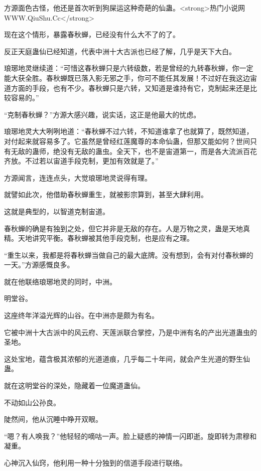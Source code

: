 
\begin{this_body}

方源面色古怪，他还是首次听到狗屎运这种奇葩的仙蛊。<strong>热门小说网WWW.QiuShu.Cc</strong>

现在这个情形，暴露春秋蝉，已经没有什么大不了的了。

反正天庭蛊仙已经知道，代表中洲十大古派也已经了解，几乎是天下大白。

琅琊地灵继续道：“可惜这春秋蝉只是六转级数，若是曾经的九转春秋蝉，你一定能大获全胜。春秋蝉既已落入影无邪之手，你可不能任其发展！不过好在我这边宙道方面的手段，也有不少。春秋蝉只是六转，又知道是谁持有它，克制起来还是比较容易的。”

“克制春秋蝉？”方源大感兴趣，说实话，这正是他最大的忧虑。

琅琊地灵大大咧咧地道：“春秋蝉不过六转，不知道谁拿了也就算了，既然知道，对付起来就容易多了。它虽然是曾经红莲魔尊的本命仙蛊，但那又能如何？世间只有无敌的蛊师，绝没有无敌的蛊虫。全天下，也不是宙道第一，而是各大流派百花齐放。不过若以宙道手段克制，更加有效就是了。”

方源闻言，连连点头，大觉琅琊地灵说得有理。

就譬如此次，他借助春秋蝉重生，就被影宗算到，甚至大肆利用。

这就是典型的，以智道克制宙道。

春秋蝉的确是有独到之处，但它并非是无敌的存在。人是万物之灵，蛊是天地真精。天地讲究平衡。春秋蝉被其他手段克制，也是应有之理。

“重生以来，我都是将春秋蝉当做自己的最大底牌。没有想到，会有对付春秋蝉的一天。”方源感慨良多。

就在他联络琅琊地灵的同时，中洲。

明堂谷。

这座终年洋溢光辉的山谷。在中洲亦是颇为有名。

它被中洲十大古派中的风云府、天莲派联合掌控，乃是中洲有名的产出光道蛊虫的圣地。

这处宝地，蕴含极其浓郁的光道道痕，几乎每二十年间，就会产生光道的野生仙蛊。

就在这明堂谷的深处，隐藏着一位魔道蛊仙。

不动如山公孙良。

陡然间，他从沉睡中睁开双眼。

“嗯？有人唤我？”他轻轻的嘀咕一声。脸上疑惑的神情一闪即逝。旋即转为肃穆和凝重。

心神沉入仙窍，他利用一种十分独到的信道手段进行联络。


\end{this_body}
